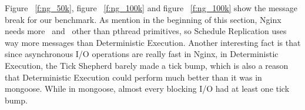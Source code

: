 Figure ~\ref{f:ng_50k}, figure ~\ref{f:ng_100k} and figure ~\ref{f:ng_100k} show the message break for our benchmark. As mention in the beginning of this section, Nginx needs more \detstart\ and \detend\ other than pthread primitives, so Schedule Replication uses way more messages than Deterministic Execution. Another interesting fact is that since asynchronous I/O operations are really fast in Nginx, in Deterministic Execution, the Tick Shepherd barely made a tick bump, which is also a reason that Deterministic Execution could perform much better than it was in mongoose. While in mongoose, almost every blocking I/O had at least one tick bump.





